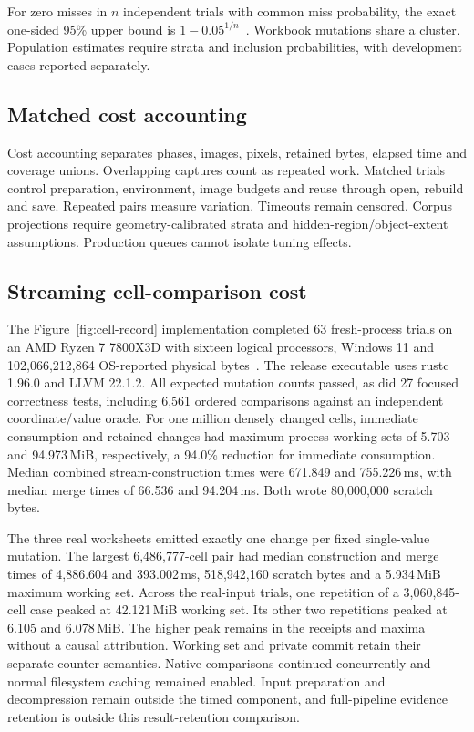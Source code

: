 For zero misses in $n$ independent trials with common miss probability, the
exact one-sided 95\% upper bound is $1-0.05^{1/n}$~\cite{binomialintervals}.
Workbook mutations share a cluster. Population estimates require strata and
inclusion probabilities, with development cases reported separately.

\subsection{Matched cost accounting}

Cost accounting separates phases, images, pixels, retained bytes, elapsed time
and coverage unions. Overlapping captures count as repeated work. Matched trials
control preparation, environment, image budgets and reuse through open, rebuild
and save. Repeated pairs measure variation. Timeouts remain censored. Corpus
projections require geometry-calibrated strata and hidden-region/object-extent
assumptions. Production queues cannot isolate tuning effects.

\subsection{Streaming cell-comparison cost}
The Figure~\ref{fig:cell-record} implementation completed 63 fresh-process trials on an AMD
Ryzen 7 7800X3D with sixteen logical processors, Windows 11 and
102,066,212,864 OS-reported physical bytes~\cite{cellstreamryzen}.
The release executable uses rustc 1.96.0 and LLVM 22.1.2. All expected mutation
counts passed, as did 27 focused correctness tests, including 6,561 ordered
comparisons against an independent coordinate/value oracle.
For one million densely changed cells, immediate consumption and retained
changes had maximum process working sets of 5.703 and 94.973\,MiB,
respectively, a 94.0\% reduction for immediate consumption. Median combined
stream-construction times were 671.849 and 755.226\,ms, with median merge
times of 66.536 and 94.204\,ms. Both wrote 80,000,000 scratch bytes.

The three real worksheets emitted exactly one change per fixed
single-value mutation. The largest 6,486,777-cell pair had median construction
and merge times of 4,886.604 and 393.002\,ms, 518,942,160 scratch bytes and a
5.934\,MiB maximum working set. Across the real-input trials, one repetition
of a 3,060,845-cell case peaked at 42.121\,MiB working set. Its other two
repetitions peaked at 6.105 and 6.078\,MiB. The higher peak remains in the
receipts and maxima without a causal attribution. Working set and private
commit retain their separate counter semantics. Native comparisons continued
concurrently and normal filesystem caching remained enabled.
Input preparation and decompression remain outside
the timed component, and full-pipeline evidence retention is outside this
result-retention comparison.


